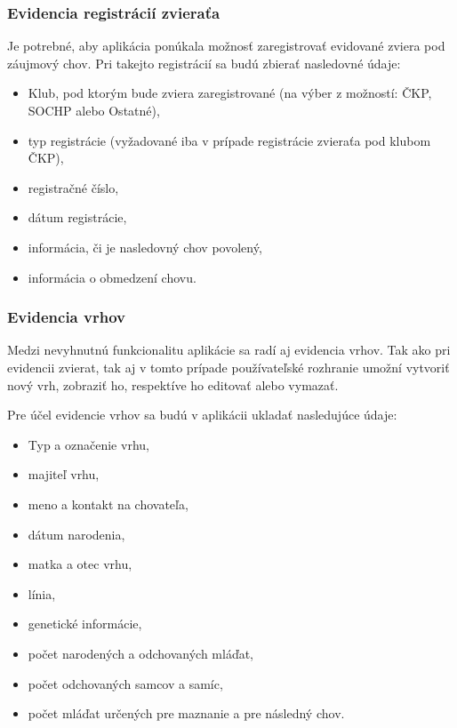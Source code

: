 \subsubsection{Evidencia registrácií zvieraťa}\label{evidencia-registracii-zvierata}
Je potrebné, aby aplikácia ponúkala možnosť zaregistrovať evidované zviera pod záujmový chov.
Pri takejto registrácií sa budú zbierať nasledovné údaje:

\begin{itemize}
	\item Klub, pod ktorým bude zviera zaregistrované (na výber z možností: ČKP, SOCHP alebo Ostatné),
	\item typ registrácie (vyžadované iba v prípade registrácie zvieraťa pod klubom ČKP),
	\item registračné číslo,
	\item dátum registrácie,
	\item informácia, či je nasledovný chov povolený,
	\item informácia o obmedzení chovu.
\end{itemize}

\subsubsection{Evidencia vrhov}
Medzi nevyhnutnú funkcionalitu aplikácie sa radí aj evidencia vrhov. Tak ako pri evidencii zvierat, tak aj v tomto prípade používateľské rozhranie umožní vytvoriť nový vrh, zobraziť ho, respektíve ho editovať alebo vymazať. 

\hfill \break
Pre účel evidencie vrhov sa budú v aplikácii ukladať nasledujúce údaje:

\begin{itemize}
	\item Typ a označenie vrhu,
	\item majiteľ vrhu,
	\item meno a kontakt na chovateľa,
	\item dátum narodenia,
	\item matka a otec vrhu,
	\item línia,
	\item genetické informácie,
	\item počet narodených a odchovaných mláďat,
	\item počet odchovaných samcov a samíc,
	\item počet mláďat určených pre maznanie a pre následný chov.
\end{itemize}

